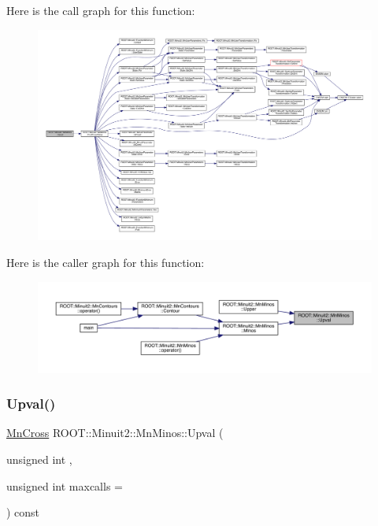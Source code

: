 Here is the call graph for this function\+:
\nopagebreak
\begin{figure}[H]
\begin{center}
\leavevmode
\includegraphics[width=350pt]{dc/d91/classROOT_1_1Minuit2_1_1MnMinos_a6fb073e7f84cb2d038714e362eda732a_cgraph}
\end{center}
\end{figure}
Here is the caller graph for this function\+:
\nopagebreak
\begin{figure}[H]
\begin{center}
\leavevmode
\includegraphics[width=350pt]{dc/d91/classROOT_1_1Minuit2_1_1MnMinos_a6fb073e7f84cb2d038714e362eda732a_icgraph}
\end{center}
\end{figure}
\mbox{\label{classROOT_1_1Minuit2_1_1MnMinos_a6fb073e7f84cb2d038714e362eda732a}} 
\subsubsection{\texorpdfstring{Upval()}{Upval()}\hspace{0.1cm}{\footnotesize\ttfamily [2/3]}}
{\footnotesize\ttfamily \mbox{\hyperlink{classROOT_1_1Minuit2_1_1MnCross}{Mn\+Cross}} R\+O\+O\+T\+::\+Minuit2\+::\+Mn\+Minos\+::\+Upval (\begin{DoxyParamCaption}\item[{unsigned int}]{,  }\item[{unsigned int}]{maxcalls = {} }\end{DoxyParamCaption}) const}

